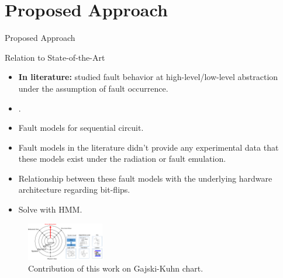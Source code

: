 \documentclass[aspectratio=1610]{beamer}
\begin{document}
\section{Proposed Approach}
\begin{frame}{Proposed Approach}



\begin{block}{Relation to State-of-the-Art}
\end{block}
\begin{itemize}
\item \textbf{In literature:} studied fault behavior at high-level/low-level abstraction under the assumption of fault occurrence.
\item \textbf{\cite{robache2013methodology} \cite{hobeika2014multi}}.
\item Fault models for sequential circuit.
\item Fault models in the literature didn't provide any experimental data that these models exist under the radiation or fault emulation.
\item Relationship between these fault models with the underlying hardware architecture regarding bit-flips.

\item Solve with HMM.


\end{itemize}
\vspace{-0.5cm}
\begin{figure}[tb!]
 \centering
  \captionsetup{justification=centering}    
   \includegraphics[width=0.3\textwidth]{Figures/ychart-block.pdf}
   \caption{Contribution of this work on Gajski-Kuhn chart.}
\label{fig:ychart}
\end{figure}


\end{frame}
\end{document}
